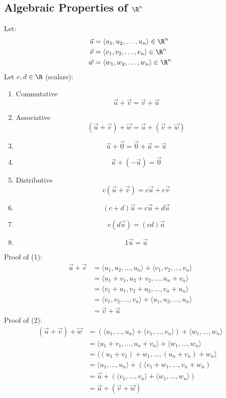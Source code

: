 \documentclass{math}
\begin{document}
\subsection*{Algebraic Properties of \( \R^n \)}
Let:
\begin{align*}
  \vec{u} &= \langle u_1,u_2,\dots,u_n\rangle\in\R^n \\
  \vec{v} &= \langle v_1,v_2,\dots,v_n\rangle\in\R^n \\
  \vec{w} &= \langle w_1,w_2,\dots,w_n\rangle\in\R^n
\end{align*}
Let \( c,d\in\R \) (scalars):
\begin{enumerate}
  \item Commutative
    \[ \vec{u}+\vec{v} = \vec{v}+\vec{u} \]
  \item Associative
    \[ (\vec{u}+\vec{v})+\vec{w} = \vec{u}+(\vec{v}+\vec{w}) \]
  \item
    \[ \vec{u}+\vec{0} = \vec{0}+\vec{u} = \vec{u} \]
  \item
    \[ \vec{u}+(-\vec{u}) = \vec{0} \]
  \item Distributive
    \[ c(\vec{u}+\vec{v}) = c\vec{u}+c\vec{v} \]
  \item
    \[ (c+d)\vec{u} = c\vec{u}+d\vec{u} \]
  \item
    \[ c(d\vec{u}) = (cd)\vec{u} \]
  \item
    \[ 1\vec{u} = \vec{u} \]
\end{enumerate}
Proof of (1):
\begin{align*}
  \vec{u}+\vec{v} &= \langle u_1,u_2,\dots,u_n\rangle+
    \langle v_1,v_2,\dots,v_n\rangle \\
  &= \langle u_1+v_1,u_2+v_2,\dots,u_n+v_n\rangle \\
  &= \langle v_1+u_1,v_2+u_2,\dots,v_n+u_n\rangle \\
  &= \langle v_1,v_2,\dots,v_n\rangle+
    \langle u_1,u_2,\dots,u_n\rangle \\
  &= \vec{v}+\vec{u}
\end{align*}
Proof of (2):
\begin{align*}
  (\vec{u}+\vec{v})+\vec{w} &= (\langle u_1,\dots,u_n\rangle+
    \langle v_1,\dots,v_n\rangle)+\langle w_1,\dots,w_n\rangle \\
  &= \langle u_1+v_1,\dots,u_n+v_n\rangle+
    \langle w_1,\dots,w_n\rangle \\
  &= \langle(u_1+v_1)+w_1,\dots,(u_n+v_n)+w_n\rangle \\
  &= \langle u_1,\dots,u_n\rangle +
    (\langle v_1+w_1,\dots,v_n+w_n) \\
  &= \vec{u}+(\langle v_1,\dots,v_n\rangle+
    \langle w_1,\dots,w_n\rangle) \\
  &= \vec{u}+(\vec{v}+\vec{w})
\end{align*}
\end{document}
